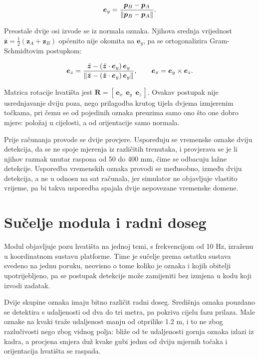 \begin{equation}
    \bm{e}_y = \frac{\bm{p}_B - \bm{p}_A}{\left\lVert \bm{p}_B - \bm{p}_A \right\rVert} .
    \label{eq:osy}
\end{equation}

Preostale dvije osi izvode se iz normala oznaka. Njihova srednja vrijednost
$\bar{\bm{z}} = \tfrac{1}{2}(\bm{z}_A + \bm{z}_B)$ općenito nije okomita na $\bm{e}_y$, pa se
ortogonalizira Gram-Schmidtovim postupkom:

\begin{equation}
    \bm{e}_z = \frac{\bar{\bm{z}} - (\bar{\bm{z}} \cdot \bm{e}_y)\,\bm{e}_y}
    {\left\lVert \bar{\bm{z}} - (\bar{\bm{z}} \cdot \bm{e}_y)\,\bm{e}_y \right\rVert} ,
    \qquad
    \bm{e}_x = \bm{e}_y \times \bm{e}_z .
    \label{eq:ortogonalizacija}
\end{equation}

Matrica rotacije hvatišta jest $\bm{R} = [\,\bm{e}_x \ \ \bm{e}_y \ \ \bm{e}_z\,]$. Ovakav
postupak nije usrednjavanje dviju poza, nego prilagodba krutog tijela dvjema izmjerenim
točkama, pri čemu se od pojedinih oznaka preuzima samo ono što one dobro mjere: položaj u
cijelosti, a od orijentacije samo normala.

Prije računanja provode se dvije provjere. Uspoređuju se vremenske oznake dviju detekcija, da
se ne spoje mjerenja iz različitih trenutaka, i provjerava se je li njihov razmak unutar
raspona od 50 do 400 mm, čime se odbacuju lažne detekcije. Usporedba vremenskih oznaka provodi
se međusobno, između dviju detekcija, a ne u odnosu na sat računala, jer simulator ne
objavljuje vlastito vrijeme, pa bi takva usporedba spajala dvije nepovezane vremenske domene.

\section{Sučelje modula i radni doseg}
\label{sec:perception-iface}

Modul objavljuje pozu hvatišta na jednoj temi, s frekvencijom od 10 Hz, izraženu u
koordinatnom sustavu platforme. Time je sučelje prema ostatku sustava svedeno na jednu poruku,
neovisno o tome koliko je oznaka i kojih obitelji upotrijebljeno, pa se postupak detekcije može
zamijeniti bez izmjena u kodu koji izvodi zadatak.

Dvije skupine oznaka imaju bitno različit radni doseg. Središnja oznaka pouzdano se detektira s
udaljenosti od dva do tri metra, pa pokriva cijelu fazu prilaza. Male oznake na kvaki traže
udaljenost manju od otprilike 1.2 m, i to ne zbog razlučivosti nego zbog vidnog polja: bliže
od te udaljenosti gornja oznaka izlazi iz kadra, a procjena smjera duž kvake gubi jednu od dviju
mjernih točaka i orijentacija hvatišta se raspada.

